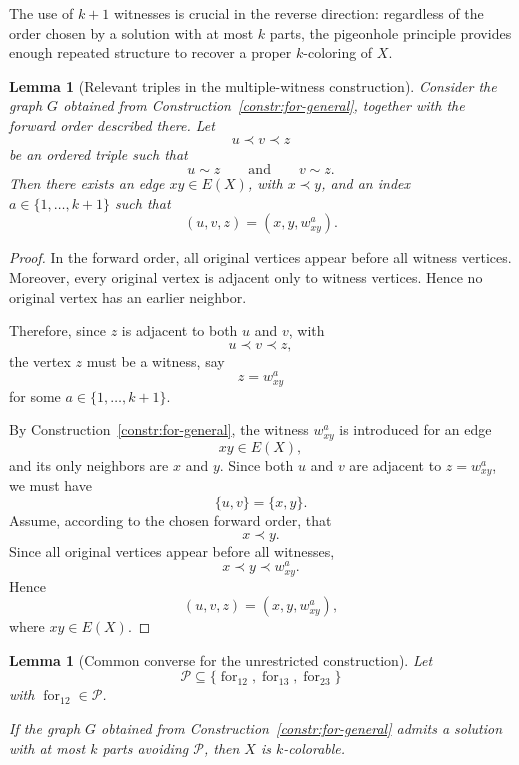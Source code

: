 \documentclass[12pt]{article}
\theoremstyle{plain}
\newtheorem{lemma}[theorem]{Lemma}
\theoremstyle{definition}
\theoremstyle{remark}
\theoremstyle{definition}
\newcommand{\forlabel}{\mathrm{for}}
\DeclareRobustCommand{\forparam}[1]{%
  \ensuremath{\mathop{\forlabel}\nolimits_{#1}}%
}
\begin{document}
The use of \(k+1\) witnesses is crucial in the reverse direction:
regardless of the order chosen by a solution with at most \(k\) parts,
the pigeonhole principle provides enough repeated structure to recover
a proper \(k\)-coloring of \(X\).






\begin{lemma}[Relevant triples in the multiple-witness construction]
\label{lem:for-unrestricted-forward-relevant-triples}
Consider the graph \(G\) obtained from
Construction~\ref{constr:for-general}, together with the forward
order described there. Let
\[
u\prec v\prec z
\]
be an ordered triple such that
\[
u\sim z
\qquad\text{and}\qquad
v\sim z.
\]
Then there exists an edge \(xy\in E(X)\), with \(x\prec y\), and an
index \(a\in\{1,\dots,k+1\}\) such that
\[
(u,v,z)=(x,y,w^a_{xy}).
\]
\end{lemma}

\begin{proof}
In the forward order, all original vertices appear before all witness
vertices. Moreover, every original vertex is adjacent only to witness
vertices. Hence no original vertex has an earlier neighbor.

Therefore, since \(z\) is adjacent to both \(u\) and \(v\), with
\[
u\prec v\prec z,
\]
the vertex \(z\) must be a witness, say
\[
z=w^a_{xy}
\]
for some \(a\in\{1,\dots,k+1\}\).

By Construction~\ref{constr:for-general}, the witness
\(w^a_{xy}\) is introduced for an edge
\[
xy\in E(X),
\]
and its only neighbors are \(x\) and \(y\). Since both \(u\) and \(v\)
are adjacent to \(z=w^a_{xy}\), we must have
\[
\{u,v\}=\{x,y\}.
\]
Assume, according to the chosen forward order, that
\[
x\prec y.
\]
Since all original vertices appear before all witnesses,
\[
x\prec y\prec w^a_{xy}.
\]
Hence
\[
(u,v,z)=(x,y,w^a_{xy}),
\]
where \(xy\in E(X)\).
\end{proof}




\begin{lemma}[Common converse for the unrestricted construction]
\label{lem:for-unrestricted-common-converse}
Let
\[
\mathcal P\subseteq
\{\forparam{12},\forparam{13},\forparam{23}\}
\]
with \(\forparam{12}\in\mathcal P\).

If the graph \(G\) obtained from
Construction~\ref{constr:for-general}
admits a solution with at most \(k\) parts avoiding \(\mathcal P\),
then \(X\) is \(k\)-colorable.
\end{lemma}
\end{document}
